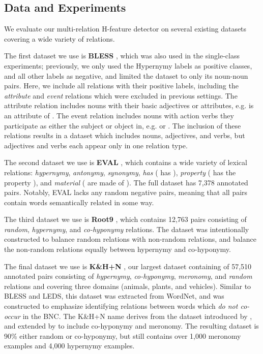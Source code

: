 \subsection{Data and Experiments}

We evaluate our multi-relation H-feature detector on several existing datasets covering a wide variety of relations.

The first dataset we use is {\bf BLESS} \cite{baroni:2011:gems}, which was also used
in the single-class experiments; previously, we only used the Hypernymy labels
as positive classes, and all other labels as negative, and limited the dataset
to only its noun-noun pairs. Here, we include all relations with their positive
labels, including the {\em attribute} and {\em event} relations which were
excluded in previous settings. The attribute relation includes nouns with their
basic adjectives or attributes, e.g.  is an attribute of
. The event relation includes nouns with action verbs they participate
as either the subject or object in, e.g.  or . The inclusion of these relations results in a dataset which includes
nouns, adjectives, and verbs, but adjectives and verbs each appear only in one
relation type.

The second dataset we use is {\bf EVAL} \cite{santus:2015:ws}, which contains
a wide variety of lexical relations: {\em hypernymy}, {\em antonymy}, {\em
synonymy}, {\em has} ( has ), {\em property}
( has the property ), and {\em material} (
are {made of} ).  The full dataset has 7,378 annotated pairs.
Notably, EVAL lacks any random negative pairs, meaning that all pairs contain
words semantically related in some way.

The third dataset we use is {\bf Root9} \cite{santus:2016:lrec}, which contains
12,763 pairs consisting of {\em random}, {\em hypernymy}, and {\em co-hyponymy}
relations. The dataset was intentionally constructed to balance random
relations with non-random relations, and balance the non-random relations
equally between hypernymy and co-hyponymy.

The final dataset we use is {\bf K\&H+N} \cite{necsulescu:2015:starsem}, our
largest dataset containing of 57,510 annotated pairs consisting of {\em
hypernymy}, {\em co-hyponymy}, {\em meronomy}, and {\em random} relations and
covering three domains (animals, plants, and vehicles). Similar to BLESS and
LEDS, this dataset was extracted from WordNet, and was constructed to emphasize
identifying relations between words which {\em do not co-occur} in the BNC. The
K\&H+N name derives from the dataset introduced by ,
and extended by  to include co-hyponymy
and meronomy.  The resulting dataset is 90\% either random or co-hyponymy, but
still contains over 1,000 meronomy examples and 4,000 hypernymy examples.


